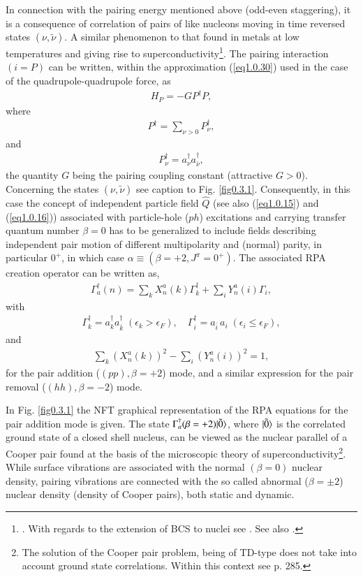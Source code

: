 In connection with the pairing energy mentioned above (odd-even staggering),  it is a consequence of correlation of pairs of like nucleons moving in  time reversed states $(\nu,\tilde \nu)$. A similar phenomenon to that found in metals at low temperatures and giving rise to superconductivity\footnote{\cite{Bardeen:57a,Bardeen:57b}. With regards to the extension of BCS to nuclei see \cite{Bohr:58}. See also \cite{Broglia:13}.}. The pairing interaction $(i=P)$ can be written, within the approximation (\ref{eq1.0.30}) used in the case of the quadrupole-quadrupole force, as 
\begin{align}\label{eq1.0.32}
H_P=- GP^\dagger P,
\end{align}
where
\begin{align}\label{eq1.3.5}
P^\dagger=\sum_{\nu>0}P^\dagger_\nu,
\end{align}
  and
\begin{align}\label{eq1.0.33}
 P^\dagger_\nu=a^\dagger_\nu a^\dagger_{\bar\nu},
\end{align}
the quantity  $G$ being the pairing coupling constant (attractive $G>0$). Concerning the states $(\nu,\tilde\nu)$ see caption to Fig. \ref{fig0.3.1}.
Consequently, in this case the concept of independent particle field $\hat Q$ (see also (\ref{eq1.0.15}) and (\ref{eq1.0.16})) associated with particle-hole ($ph$) excitations and carrying transfer quantum number $\beta=0$ has to be generalized to include fields describing independent pair motion of different multipolarity and (normal) parity, in particular $0^+$, in which case $\alpha\equiv(\beta=+2,J^\pi=0^+)$. The associated RPA creation operator can be written as, 
\begin{align}\label{eq1.0.34}
\Gamma_a^\dagger(n)=\sum_k X_n^a(k)\Gamma_k^\dagger+\sum_iY^a_n(i)\Gamma_i,
\end{align}
with 
\begin{align}\label{eq1.0.35}
\Gamma^\dagger_k=a^\dagger_ka^\dagger_{\bar k}\;(\epsilon_k>\epsilon_F),\quad \Gamma^\dagger_i=a_{\bar i}\,a_i\;(\epsilon_i\leq\epsilon_F),
\end{align}
and
\begin{align}\label{eq1.0.36}
\sum_k\left(X_{n}^{a}(k)\right)^2-\sum_i \left(Y_{n}^{a}(i)\right)^2=1,
\end{align}
for the pair addition ($(pp),\beta=+2$) mode, and a similar expression for the pair removal ($(hh),\beta=-2$) mode.

 In Fig. \ref{fig0.3.1} the NFT graphical representation of the RPA equations for the pair addition mode is given. The state $\Gamma^\dagger_a(\beta=+2)|{\tilde 0} \rangle$, where $|{\tilde 0} \rangle$ is the correlated ground state of a closed shell nucleus, can be viewed as the nuclear parallel of a Cooper pair found at the basis of the microscopic theory of superconductivity\footnote{\label{f25Ch1} The solution of the Cooper pair problem, being of TD-type does not take into account ground state correlations. Within this context see \cite{Ambegaokar:69} p. 285.}.
While surface vibrations are associated with the normal $(\beta=0)$ nuclear density, pairing vibrations are connected with the so called abnormal ($\beta=\pm2$) nuclear density (density of Cooper pairs), both static and dynamic.

